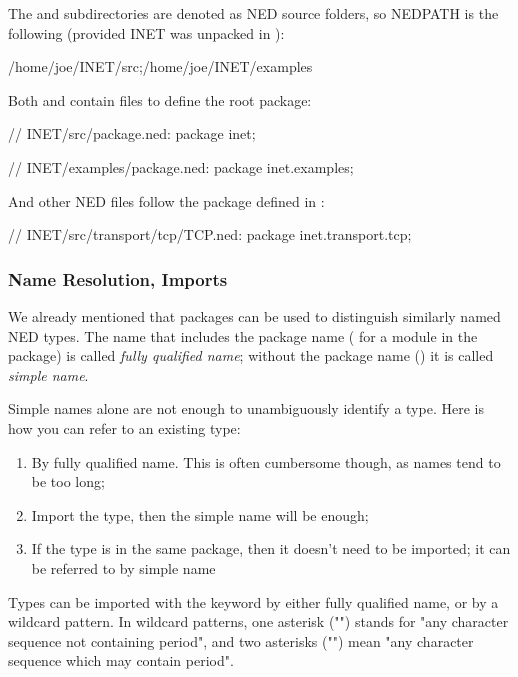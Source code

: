 The  and  subdirectories are denoted as NED source
folders, so NEDPATH is the following (provided INET was unpacked in
):

\begin{filelisting}
/home/joe/INET/src;/home/joe/INET/examples
\end{filelisting}

Both  and  contain  files to
define the root package:

\begin{ned}
// INET/src/package.ned:
package inet;
\end{ned}

\begin{ned}
// INET/examples/package.ned:
package inet.examples;
\end{ned}

And other NED files follow the package defined in :

\begin{ned}
// INET/src/transport/tcp/TCP.ned:
package inet.transport.tcp;
\end{ned}


\subsubsection{Name Resolution, Imports}

We already mentioned that packages can be used to distinguish
similarly named NED types. The name that includes the package name
( for a  module in the 
package) is called \textit{fully qualified name}; without the package
name () it is called \textit{simple name}.

Simple names alone are not enough to unambiguously identify a type.
Here is how you can refer to an existing type:

\begin{enumerate}
  \item By fully qualified name. This is often cumbersome though,
        as names tend to be too long;
  \item Import the type, then the simple name will be enough;
  \item If the type is in the same package, then it doesn't need to be
        imported; it can be referred to by simple name
\end{enumerate}

Types can be imported with the  keyword by either
fully qualified name, or by a wildcard pattern. In wildcard patterns,
one asterisk ("\ttt{*}") stands for "any character sequence not containing
period", and two asterisks ("\ttt{**}") mean "any character sequence which may
contain period".

